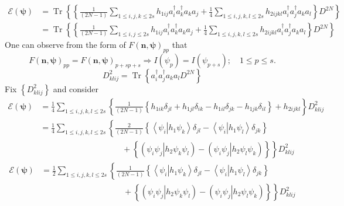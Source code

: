 \documentclass[aps,preprint]{revtex4}%
\begin{document}
\begin{align}
\mathcal{E}\left(  \mathbf{\psi}\right)   &  =\operatorname{Tr}\left\{
\left\{  \frac{1}{\left(  2N-1\right)  }\sum_{1\leq i,j,k\leq2s}h_{1ij}%
a_{i}^{\dagger}a_{k}^{\dagger}a_{k}a_{j}+\frac{1}{4}\sum_{1\leq i,j,k,l\leq
2s}h_{2ijkl}a_{i}^{\dagger}a_{j}^{\dagger}a_{k}a_{l}\right\}  D^{2N}\right\}
\\
&  =\operatorname{Tr}\left\{  \left\{  \frac{1}{\left(  2N-1\right)  }%
\sum_{1\leq i,j\leq2s}h_{1ij}a_{i}^{\dagger}a_{k}^{\dagger}a_{k}a_{j}+\frac
{1}{4}\sum_{1\leq i,j,k,l\leq2s}h_{2ijkl}a_{i}^{\dagger}a_{j}^{\dagger}%
a_{k}a_{l}\right\}  D^{2N}\right\}
\end{align}
One can observe from the form of $F\left(  \mathbf{n},\mathbf{\psi}\right)
_{pp}$ that
\begin{equation}
F\left(  \mathbf{n},\mathbf{\psi}\right)  _{pp}=F\left(  \mathbf{n}%
,\mathbf{\psi}\right)  _{p+sp+s}\Rightarrow I\left(  \psi_{p}\right)
=I\left(  \psi_{p+s}\right)  ;\quad1\leq p\leq s.
\end{equation}%
\begin{equation}
D_{klij}^{2}=\operatorname{Tr}\left\{  a_{i}^{\dagger}a_{j}^{\dagger}%
a_{k}a_{l}D^{2N}\right\}
\end{equation}
Fix $\left\{  D_{klij}^{2}\right\}  $ and consider
\begin{align}
\mathcal{E}\left(  \mathbf{\psi}\right)   &  =\frac{1}{4}\sum_{1\leq
i,j,k,l\leq2s}\left\{  \overset{}{\frac{1}{\left(  2N-1\right)  }\left\{
h_{1ik}\delta_{jl}+h_{1jl}\delta_{ik}-h_{1il}\delta_{jk}-h_{1jk}\delta
_{il}\right\}  +h_{2ijkl}}\right\}  D_{klij}^{2}\\
&  =\frac{1}{4}\sum_{1\leq i,j,k,l\leq2s}\left\{  \frac{2}{\left(
2N-1\right)  }\overset{}{\left\{  \left\langle \left.  \psi_{i}\right\vert
h_{1}\psi_{k}\right\rangle \delta_{jl}-\left\langle \left.  \psi
_{i}\right\vert h_{1}\psi_{l}\right\rangle \delta_{jk}\right\}  }\right. \\
&  \qquad\qquad\qquad\qquad\qquad\left.  \overset{}{}+\left\{  \left(  \left.
\psi_{i}\psi_{j}\right\vert h_{2}\psi_{k}\psi_{l}\right)  -\left(  \left.
\psi_{i}\psi_{j}\right\vert h_{2}\psi_{l}\psi_{k}\right)  \right\}  \right\}
D_{klij}^{2}%
\end{align}%
\begin{align}
\mathcal{E}\left(  \mathbf{\psi}\right)   &  =\frac{1}{2}\sum_{1\leq
i,j,k,l\leq2s}\left\{  \frac{1}{\left(  2N-1\right)  }\overset{}{\left\{
\left\langle \left.  \psi_{i}\right\vert h_{1}\psi_{k}\right\rangle
\delta_{jl}-\left\langle \left.  \psi_{i}\right\vert h_{1}\psi_{l}%
\right\rangle \delta_{jk}\right\}  }\right. \\
&  \qquad\qquad\qquad\qquad\qquad+\left.  \left\{  \left(  \left.  \psi
_{i}\psi_{j}\right\vert h_{2}\psi_{k}\psi_{l}\right)  -\left(  \left.
\psi_{i}\psi_{j}\right\vert h_{2}\psi_{l}\psi_{k}\right)  \right\}  \right\}
D_{klij}^{2}%
\end{align}
\end{document}
